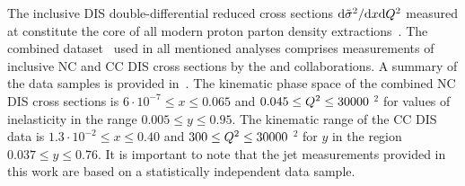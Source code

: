 The inclusive DIS double-differential reduced cross sections $\mathrm{d}\tilde\sigma^2/\mathrm{d}x\mathrm{d}\mbox{${Q^2}$}$ measured at \hera constitute the core of all modern proton parton density extractions~\cite{Lai:2010vv,Martin:2009iq,Alekhin:2012ig,Ball:2011uy,Aaron:2009aa}. The combined dataset~\cite{Aaron:2009aa} used in all mentioned analyses comprises measurements of inclusive NC and CC DIS cross sections by the \hone and \zeus collaborations. A summary of the data samples is provided in~\cite{Aaron:2009aa}. The kinematic phase space of the combined NC DIS cross sections is $6\cdot 10^{-7} \le x \le 0.065$ and $0.045 \le \mbox{${Q^2}$} \le 30000$ \GeV$^2$ for values of inelasticity in the range $0.005 \le y \le 0.95$. The kinematic range of the CC DIS data is $1.3\cdot 10^{-2} \le x \le 0.40$ and $300 \le \mbox{${Q^2}$} \le 30000$ \GeV$^2$ for $y$ in the region $0.037 \le y \le 0.76$. It is important to note that the jet measurements provided in this work are based on a statistically independent data sample.

